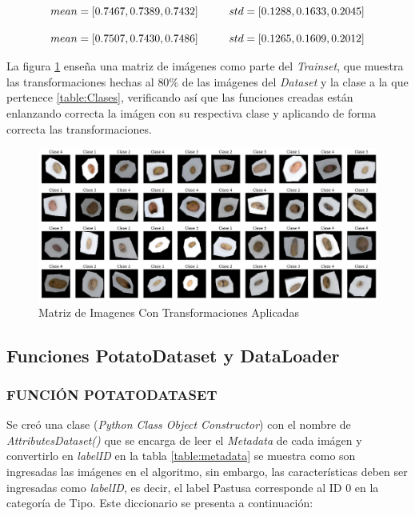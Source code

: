 			\begin{equation}				{mean = [0.7467, 0.7389, 0.7432] \hspace*{1cm}  std  = [0.1288, 0.1633, 0.2045]}
				\label{eq:meanstd1}
			\end{equation}


			\begin{equation}
				{mean = [0.7507, 0.7430, 0.7486] \hspace*{1cm}  std  = [0.1265, 0.1609, 0.2012]}
				\label{eq:meanstd2}
			\end{equation}


			La figura \ref{fig:agumentation} enseña una matriz de imágenes como parte del \textit{Trainset}, que muestra las transformaciones hechas al $80\%$ de las imágenes del \textit{Dataset} y la clase a la que pertenece \ref{table:Clases}, verificando así que las funciones creadas están enlanzando correcta la imágen con su respectiva clase y aplicando de forma correcta las transformaciones.

			\newpage
			\begin{figure}[ht]
				\centering
				\includegraphics[scale=0.4]{Figs/augmentation.png}
				\caption{Matriz de Imagenes Con Transformaciones Aplicadas}
				\label{fig:agumentation}
			\end{figure}	

		\subsection{Funciones PotatoDataset y DataLoader}
		
		
			\subsubsection{FUNCIÓN POTATODATASET}
			
			Se creó una clase (\textit{Python Class Object Constructor}) con el nombre de \textit{AttributesDataset()} que se encarga de leer el \textit{Metadata}  de cada imágen y convertirlo en \textit{labelID} en la tabla \ref{table:metadata} se muestra como son ingresadas las imágenes en el algoritmo, sin embargo, las características deben ser ingresadas como \textit{labelID}, es decir, el label Pastusa corresponde al ID 0 en la categoría de Tipo. Este diccionario se presenta a continuación:			
	
